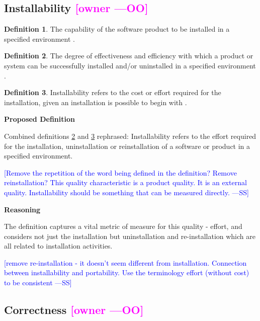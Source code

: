 \documentclass[letterpaper, cleveref]{lipics-v2019}
\newcommand{\authornote}[3]{\textcolor{#1}{[#3 ---#2]}}
\newcommand{\authornote}[3]{}
\newcommand{\wss}[1]{\authornote{blue}{SS}{#1}} %
\newcommand{\oo}[1]{\authornote{magenta}{OO}{#1}} %
\theoremstyle{definition}
\newtheorem{defn}{Definition}
\begin{document}
\subsection{Installability \oo{owner}}

\begin{defn}
  The capability of the software product to be installed in a specified
  environment \citep{ISO9126}. %
\end{defn}

\begin{defn} \label{Installability_Selected2}
	The degree of effectiveness and efficiency with which a product or system can
	be successfully installed and/or uninstalled in a specified environment
	\citep{ISO/IEC25010}. %
\end{defn}

\begin{defn} \label{Installability_Selected1} Installability refers to the cost
  or effort required for the installation, given an installation is possible to
  begin with \citep{lenhard2013measuring}.
\end{defn}

\noindent \textbf{Proposed Definition}

Combined definitions \ref{Installability_Selected2} and
\ref{Installability_Selected1} rephrased: Installability refers to the effort
required for the installation, uninstallation or reinstallation of a software or
product in a specified environment.

\wss{Remove the repetition of the word being defined in the definition?  Remove
  reinstallation?  This quality characteristic is a product quality.  It is an
  external quality.  Installability should be something that can be measured
  directly.}

\noindent \textbf{Reasoning}

 The definition captures a vital metric of measure for this quality - effort,
 and considers not just the installation but uninstallation and re-installation
 which are all related to installation activities.

 \wss{remove re-installation - it doesn't seem different from installation.
 Connection between installability and portability.  Use the terminology effort
 (without cost) to be consistent} 


 \subsection{Correctness \oo{owner}}
\end{document}
